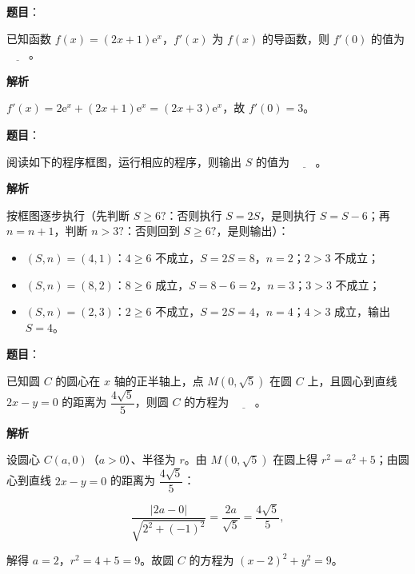 \begin{answer}

\textbf{题目}：

已知函数 \(f(x)=(2x+1)\mathrm{e}^{x}\)，\(f'(x)\) 为 \(f(x)\) 的导函数，则 \(f'(0)\) 的值为 \(\underline{\qquad}\)。

\textbf{解析}

\(f'(x)=2\mathrm{e}^{x}+(2x+1)\mathrm{e}^{x}=(2x+3)\mathrm{e}^{x}\)，故 \(f'(0)=3\)。


\end{answer}
\begin{answer}

\textbf{题目}：

阅读如下的程序框图，运行相应的程序，则输出 \(S\) 的值为 \(\underline{\qquad}\)。
\nopagebreak[4]
\begin{center}\end{center}
\nopagebreak[4]
\textbf{解析}

按框图逐步执行（先判断 \(S\geqslant 6?\)：否则执行 \(S=2S\)，是则执行 \(S=S-6\)；再 \(n=n+1\)，判断 \(n>3?\)：否则回到 \(S\geqslant 6?\)，是则输出）：

\begin{itemize}
\item \((S,n)=(4,1)\)：\(4\geqslant 6\) 不成立，\(S=2S=8\)，\(n=2\)；\(2>3\) 不成立；
\item \((S,n)=(8,2)\)：\(8\geqslant 6\) 成立，\(S=8-6=2\)，\(n=3\)；\(3>3\) 不成立；
\item \((S,n)=(2,3)\)：\(2\geqslant 6\) 不成立，\(S=2S=4\)，\(n=4\)；\(4>3\) 成立，输出 \(S=4\)。
\end{itemize}


\end{answer}
\begin{answer}

\textbf{题目}：

已知圆 \(C\) 的圆心在 \(x\) 轴的正半轴上，点 \(M(0,\sqrt{5})\) 在圆 \(C\) 上，且圆心到直线 \(2x-y=0\) 的距离为 \(\dfrac{4\sqrt{5}}{5}\)，则圆 \(C\) 的方程为 \(\underline{\qquad}\)。

\textbf{解析}

设圆心 \(C(a,0)\)（\(a>0\)）、半径为 \(r\)。由 \(M(0,\sqrt{5})\) 在圆上得 \(r^{2}=a^{2}+5\)；由圆心到直线 \(2x-y=0\) 的距离为 \(\dfrac{4\sqrt{5}}{5}\)：

\nopagebreak[4]
\[
\dfrac{|2a-0|}{\sqrt{2^{2}+(-1)^{2}}}=\dfrac{2a}{\sqrt{5}}=\dfrac{4\sqrt{5}}{5},
\]

解得 \(a=2\)，\(r^{2}=4+5=9\)。故圆 \(C\) 的方程为 \((x-2)^{2}+y^{2}=9\)。


\end{answer}
